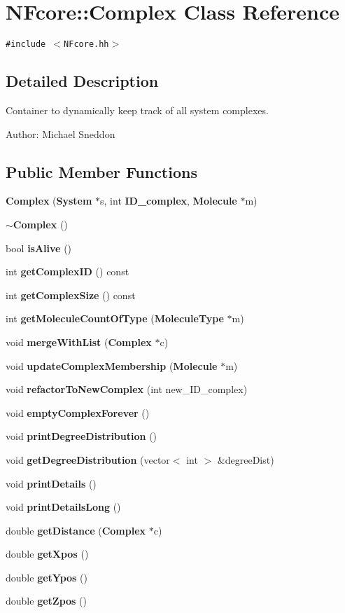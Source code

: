 \section{NFcore::Complex Class Reference}
\label{classNFcore_1_1Complex}
{\tt \#include $<$NFcore.hh$>$}



\subsection{Detailed Description}
Container to dynamically keep track of all system complexes. 

\begin{Desc}
\item[Author:]Michael Sneddon \end{Desc}
\subsection*{Public Member Functions}
\begin{CompactItemize}
\item 
{\bf Complex} ({\bf System} $\ast$s, int {\bf ID\_\-complex}, {\bf Molecule} $\ast$m)
\item 
{\bf $\sim$Complex} ()
\item 
bool {\bf isAlive} ()
\item 
int {\bf getComplexID} () const 
\item 
int {\bf getComplexSize} () const 
\item 
int {\bf getMoleculeCountOfType} ({\bf MoleculeType} $\ast$m)
\item 
void {\bf mergeWithList} ({\bf Complex} $\ast$c)
\item 
void {\bf updateComplexMembership} ({\bf Molecule} $\ast$m)
\item 
void {\bf refactorToNewComplex} (int new\_\-ID\_\-complex)
\item 
void {\bf emptyComplexForever} ()
\item 
void {\bf printDegreeDistribution} ()
\item 
void {\bf getDegreeDistribution} (vector$<$ int $>$ \&degreeDist)
\item 
void {\bf printDetails} ()
\item 
void {\bf printDetailsLong} ()
\item 
double {\bf getDistance} ({\bf Complex} $\ast$c)
\item 
double {\bf getXpos} ()
\item 
double {\bf getYpos} ()
\item 
double {\bf getZpos} ()
\end{CompactItemize}
